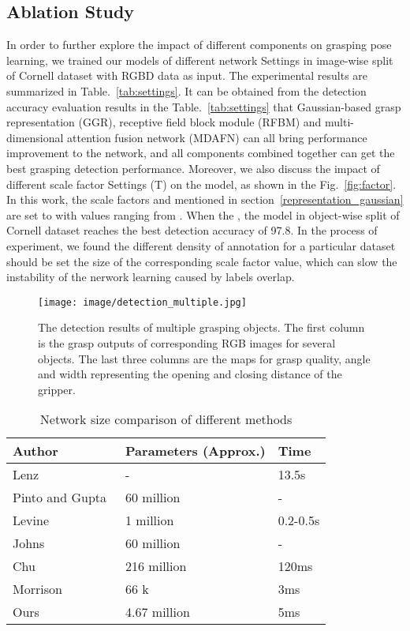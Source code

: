 \documentclass[journal]{IEEEtran}
\begin{document}
\subsection{Ablation Study}
\label{ablation_study}
In order to further explore the impact of different components on grasping pose learning, we trained our models of different network Settings in image-wise split of Cornell dataset with RGBD data as input. The experimental results are summarized in Table.~\ref{tab:settings}. It can be obtained from the detection accuracy evaluation results in the Table.~\ref{tab:settings} that Gaussian-based grasp representation (GGR), receptive field block module (RFBM) and multi-dimensional attention fusion network (MDAFN) can all bring performance improvement to the network, and all components combined together can get the best grasping detection performance. Moreover, we also discuss the impact of different scale factor Settings (T) on the model, as shown in the Fig.~\ref{fig:factor}. In this work, the scale factors  and  mentioned in section~\ref{representation_gaussian} are set to  with values ranging from . When the  , the model in object-wise split of Cornell dataset reaches the best detection accuracy of 97.8. In the process of experiment, we found the different density of annotation for a particular dataset should be set the size of the corresponding scale factor value, which can slow the instability of the nerwork learning caused by labels overlap.






\begin{figure}[t!]
	\centering  
	\texttt{[image: image/detection\_multiple.jpg]}
	\caption{The detection results of multiple grasping objects. The first column is the grasp outputs of corresponding RGB images for several objects. The last three columns are the maps for grasp quality, angle and width representing the opening and closing distance of the gripper.}
	\label{fig:detection_multiple}
\end{figure}

\begin{table}[htbp]
	\caption{Network size comparison of different methods}
	\begin{center}
		\begin{tabular}{p{80pt}|p{80pt}|p{40pt}}
			\hline
			\textbf{Author}&\textbf{Parameters (Approx.)}&{\textbf{Time}}   \\
			\hline
			Lenz~\cite{lenz}&-& 13.5s\\
			Pinto and Gupta~\cite{pinto}&60 million& -\\
			Levine~\cite{levine}&1 million& 0.2-0.5s\\
			Johns~\cite{johns}&60 million& -\\
			Chu~\cite{chu}& 216 million& 120ms\\
			Morrison~\cite{ggcnn}& 66 k & 3ms\\
\hline
			Ours& 4.67 million & 5ms\\
			\hline
		\end{tabular}
	\end{center}
	\label{tab:size}
\end{table}
\end{document}
